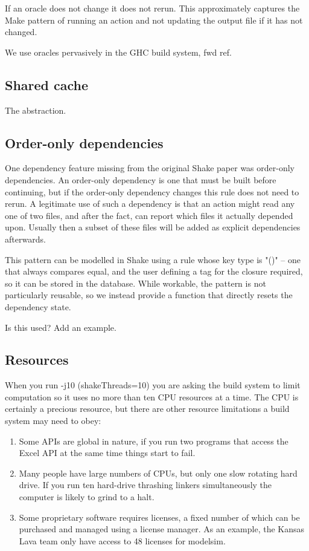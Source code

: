 If an oracle does not change it does not rerun. This approximately captures the Make pattern of running an action and not updating the output file if it has not changed.

We use oracles pervasively in the GHC build system, fwd ref.

\subsection{Shared cache}

The abstraction.

\subsection{Order-only dependencies}

One dependency feature missing from the original Shake paper was order-only dependencies. An order-only dependency is one that must be built before continuing, but if the order-only dependency changes this rule does not need to rerun. A legitimate use of such a dependency is that an action might read any one of two files, and after the fact, can report which files it actually depended upon. Usually then a subset of these files will be added as explicit dependencies afterwards.

This pattern can be modelled in Shake using a rule whose key type is \lst"()" -- one that always compares equal, and the user defining a tag for the closure required, so it can be stored in the database. While workable, the pattern is not particularly reusable, so we instead provide a function that directly resets the dependency state.

Is this used? Add an example.

\subsection{Resources}

When you run -j10 (shakeThreads=10) you are asking the build system to limit computation so it uses no more than ten CPU resources at a time. The CPU is certainly a precious resource, but there are other resource limitations a build system may need to obey:

\begin{enumerate}
\item Some APIs are global in nature, if you run two programs that access the Excel API at the same time things start to fail.
\item Many people have large numbers of CPUs, but only one slow rotating hard drive. If you run ten hard-drive thrashing linkers simultaneously the computer is likely to grind to a halt.
\item Some proprietary software requires licenses, a fixed number of which can be purchased and managed using a license manager. As an example, the Kansas Lava team only have access to 48 licenses for modelsim.
\end{enumerate}

